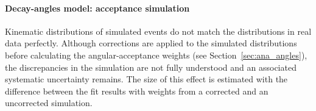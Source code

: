 \paragraph{Decay-angles model: acceptance simulation}
Kinematic distributions of simulated events do not match the distributions in real data perfectly. Although corrections are applied to the
simulated distributions before calculating the angular-acceptance weights (see Section~\ref{sec:ana_angles}), the discrepancies in the
simulation are not fully understood and an associated systematic uncertainty remains. The size of this effect is estimated with the
difference between the fit results with weights from a corrected and an uncorrected simulation.
